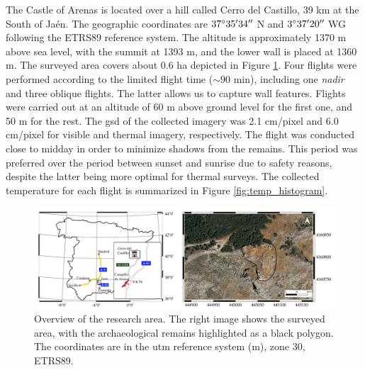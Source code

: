The Castle of Arenas is located over a hill called Cerro del Castillo, 39 \si{\kilo\meter} at the South of Jaén. The geographic coordinates are $37^{\circ}35'34'' \hspace{1mm}$N and $3^{\circ}37'20'' \hspace{1mm}$WG following the ETRS89 reference system. The altitude is approximately 1370 \si{\meter} above sea level, with the summit at 1393 \si{\meter}, and the lower wall is placed at 1360 \si{\meter}. The surveyed area covers about 0.6 \si{\hectare} depicted in Figure \ref{fig:study_site}. Four flights were performed according to the limited flight time ($\sim90$ \si{\minute}), including one \textit{nadir} and three oblique flights. The latter allows us to capture wall features. Flights were carried out at an altitude of 60 \si{\meter} above ground level for the first one, and 50 \si{\meter} for the rest. The \acrshort{gsd} of the collected imagery was 2.1 \si{\centi\meter}/pixel and 6.0 \si{\centi\meter}/pixel for visible and thermal imagery, respectively. The flight was conducted close to midday in order to minimize shadows from the remains. This period was preferred over the period between sunset and sunrise due to safety reasons, despite the latter being more optimal for thermal surveys. The collected temperature for each flight is summarized in Figure \ref{fig:temp_histogram}. 

\begin{figure}[htbp]
  \centering
  \includegraphics[width=\linewidth]{figs/castle_puerta_arenas/study_area.png}
  \caption{Overview of the research area. The right image shows the surveyed area, with the archaeological remains highlighted as a black polygon. The coordinates are in the \acrshort{utm} reference system (\si{\meter}), zone 30, ETRS89.}
  \label{fig:study_site}
\end{figure}

